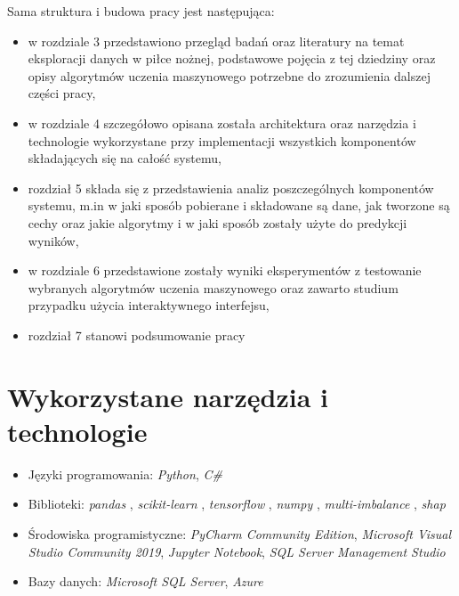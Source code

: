 \noindent Sama struktura i budowa pracy jest następująca:
\begin{itemize}
    \item w rozdziale 3 przedstawiono przegląd badań oraz literatury na temat eksploracji danych w piłce nożnej, podstawowe pojęcia z tej dziedziny oraz opisy algorytmów uczenia maszynowego potrzebne do zrozumienia dalszej części pracy,
    \item w rozdziale 4 szczegółowo opisana została architektura oraz narzędzia i technologie wykorzystane przy implementacji wszystkich komponentów składających się na całość systemu,
    \item rozdział 5 składa się z przedstawienia  analiz poszczególnych komponentów systemu, m.in w jaki sposób pobierane i składowane są dane, jak tworzone są cechy oraz jakie algorytmy i w jaki sposób zostały użyte do predykcji wyników,
    \item w rozdziale 6 przedstawione zostały wyniki eksperymentów z testowanie wybranych algorytmów uczenia maszynowego oraz zawarto studium przypadku użycia interaktywnego interfejsu,
    \item rozdział 7 stanowi podsumowanie pracy
\end{itemize}

\section{Wykorzystane narzędzia i technologie}
\begin{itemize}
    \item Języki programowania: \textit{Python}, \textit{C\#}
    \item Biblioteki: \textit{pandas} \cite{reback2020pandas}, \textit{scikit-learn} \cite{scikit-learn}, \textit{tensorflow} \cite{tensorflow2015-whitepaper}, \textit{numpy} \cite{harris2020array}, \textit{multi-imbalance} \cite{MultiImbalance2020}, \textit{shap} \cite{NIPS2017_7062}
    \item Środowiska programistyczne: \textit{PyCharm Community Edition}, \textit{Microsoft Visual Studio Community 2019}, \textit{Jupyter Notebook}, \textit{SQL Server Management Studio}
    \item Bazy danych: \textit{Microsoft SQL Server}, \textit{Azure}
\end{itemize}
